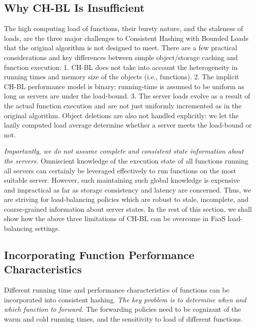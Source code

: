 
\vspace*{-0.2cm} %
\subsection{Why CH-BL Is Insufficient}

The high computing load of functions, their bursty nature, and the staleness of loads, are the three major challenges to Consistent Hashing with Bounded Loads~\cite{mirrokni2018consistent} that the original algorithm is not designed to meet. 
There are a few practical considerations and key differences between simple object/storage caching and function execution:
1. CH-BL does not take into account the heterogeneity in running times and memory size of the objects (i.e., functions).
2. The implicit CH-BL performance model is binary: running-time is assumed to be uniform as long as servers are under the load-bound. 
3. The server loads evolve as a result of the actual function execution and are not just uniformly incremented as in the original algorithm. Object deletions are also not handled explicitly: we let the lazily computed load average determine whether a server meets the load-bound or not. 

\emph{Importantly, we do not assume complete and consistent state information about the servers.}
Omniscient knowledge of the execution state of all functions running all servers can certainly be leveraged effectively to run functions on the most suitable server.
However, such maintaining such global knowledge is expensive and impractical as far as storage consistency and latency are concerned.
Thus, we are striving for load-balancing policies which are robust to stale, incomplete, and coarse-grained information about server states. 
In the rest of this section, we shall show how the above three limitations of CH-BL can be overcome in FaaS load-balancing settings. 

\vspace*{-0.4cm}
\subsection{Incorporating Function Performance Characteristics}
\label{subsec:chch}


Different running time and performance characteristics of functions can be incorporated into consistent hashing.
\emph{The key problem is to determine when and which function to forward.}
The forwarding policies need to be cognizant of the warm and cold running times, and the sensitivity to load of different functions. 

